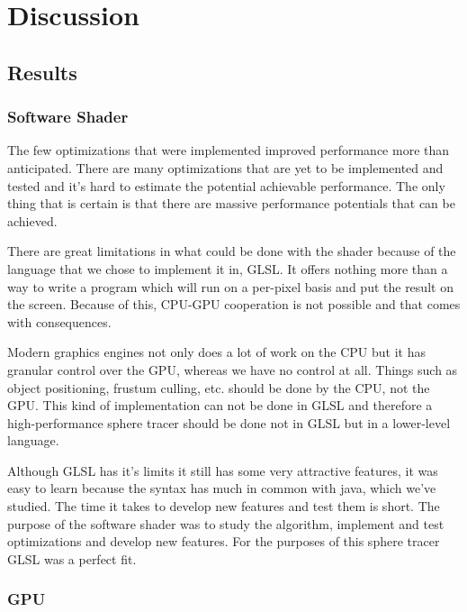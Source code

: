 \chapter{Discussion}
	
	\section{Results}
		
		\subsection{Software Shader}
		
			The few optimizations that were implemented improved performance more than anticipated.
			There are many optimizations that are yet to be implemented and tested
			and it's hard to estimate the potential achievable performance. The
			only thing that is certain is that there are massive performance 
			potentials that can be achieved.

			There are great limitations in what could be done with the shader because
			of the language that we chose to implement it in, GLSL. It offers nothing 
			more than a way to write a program which will run on a per-pixel basis
			and put the result on the screen. Because of this, CPU-GPU cooperation is not possible
			and that comes with consequences.

			Modern graphics engines not only does a lot of work on the
			CPU but it has granular control over the GPU, whereas we have no control
			at all. Things such as object positioning, frustum culling, etc. should be 
			done by the CPU, not the GPU. This kind of implementation can 
			not be done in GLSL and therefore a high-performance sphere tracer should be done not in 
			GLSL but in a lower-level language.

			Although GLSL has it's limits it still has some very attractive 
			features, it was easy to learn because the syntax has much in common
			with java, which we've studied. The time it takes to develop new 
			features and test them is short. The purpose of the software shader 
			was to study the algorithm, implement and test optimizations and
			develop new features. For the purposes of this sphere tracer GLSL
			was a perfect fit.

		
		\subsection{GPU} 
		
